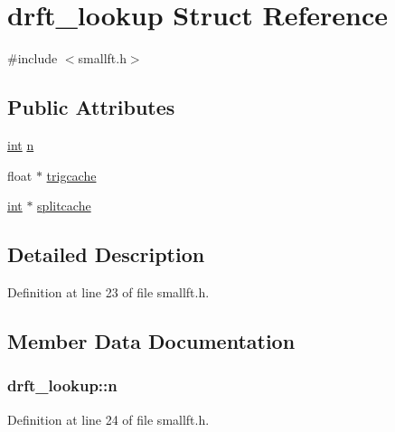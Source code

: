 \hypertarget{structdrft__lookup}{}\section{drft\+\_\+lookup Struct Reference}
\label{structdrft__lookup}


{\ttfamily \#include $<$smallft.\+h$>$}

\subsection*{Public Attributes}
\begin{DoxyCompactItemize}
\item 
\hyperlink{xmltok_8h_a5a0d4a5641ce434f1d23533f2b2e6653}{int} \hyperlink{structdrft__lookup_a47683cf492a91fbd3381eee48efa389c}{n}
\item 
float $\ast$ \hyperlink{structdrft__lookup_abadb842ed4e0b1b90b0d621acdf0ea4c}{trigcache}
\item 
\hyperlink{xmltok_8h_a5a0d4a5641ce434f1d23533f2b2e6653}{int} $\ast$ \hyperlink{structdrft__lookup_ad0e2018119f00417ea11756c1f78fd7a}{splitcache}
\end{DoxyCompactItemize}


\subsection{Detailed Description}


Definition at line 23 of file smallft.\+h.



\subsection{Member Data Documentation}
\subsubsection[{\texorpdfstring{n}{n}}]{ drft\+\_\+lookup\+::n}\hypertarget{structdrft__lookup_a47683cf492a91fbd3381eee48efa389c}{}\label{structdrft__lookup_a47683cf492a91fbd3381eee48efa389c}


Definition at line 24 of file smallft.\+h.

